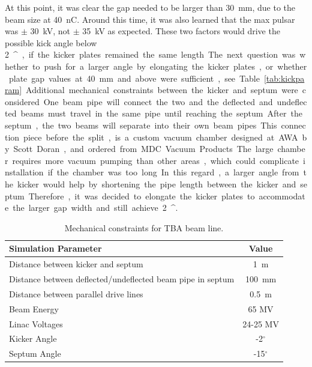 At this point, it was clear the gap needed to be larger than \SI{30}{mm}, due to the beam size at \SI{40}{nC}. 
Around this time, it was also learned that the max pulsar was $\pm$ \SI{30}{kV}, not $\pm$ \SI{35}{kV} as expected. 
These two factors would drive the possible kick angle below \SI{2}{^\circ}, if the kicker plates remained the same length.
The next question was whether to push for a larger angle by elongating the kicker plates, 
or whether plate gap values at \SI{40}{mm} and above were sufficient, see Table \ref{tab:kickparam}.
Additional mechanical constraints between the kicker and septum were considered. 
One beam pipe will connect the two and the deflected and undeflected 
beams must travel in the same pipe until reaching the septum.
After the septum, the two beams will separate into their own beam pipes.
This connection piece before the split, is a custom vacuum chamber designed at 
AWA by Scott Doran, and ordered from MDC Vacuum Products. 
The large chamber requires more vacuum pumping than other areas, 
which could complicate installation if the chamber was too long. 
In this regard, a larger angle from the kicker would help by shortening the pipe length between the kicker and septum.
Therefore, it was decided to elongate the kicker plates to accommodate the larger gap width and still achieve \SI{2}{^\circ}.
 \begin{table}%
	\begin{center}
		\caption{Mechanical constraints for TBA beam line.}
		\label{tab:mechanical}
		\begin{tabular}{lc}
			\toprule
			\toprule
			\textbf{Simulation Parameter} 	&  \textbf{Value} \\ 
			\midrule
			Distance between kicker and septum	&  \SI{1}{m} \\
			Distance between deflected/undeflected beam pipe in septum	& \SI{100}{mm} \\
			Distance between parallel drive lines	& \SI{0.5}{m} \\
			Beam Energy 				& 65 MV\\ 
			Linac Voltages 				& 24-25 MV \\
			Kicker Angle				& -2$^\circ$ \\
			Septum Angle				& -15$^\circ$\\ 
			\bottomrule
		\end{tabular}
	\end{center}
\end{table}

